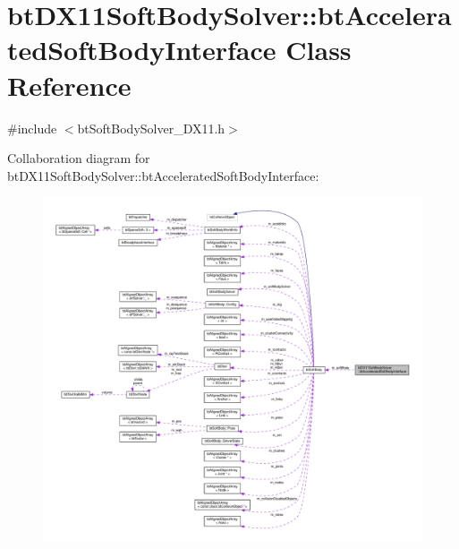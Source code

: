 \hypertarget{classbtDX11SoftBodySolver_1_1btAcceleratedSoftBodyInterface}{}\section{bt\+D\+X11\+Soft\+Body\+Solver\+:\+:bt\+Accelerated\+Soft\+Body\+Interface Class Reference}
\label{classbtDX11SoftBodySolver_1_1btAcceleratedSoftBodyInterface}


{\ttfamily \#include $<$bt\+Soft\+Body\+Solver\+\_\+\+D\+X11.\+h$>$}



Collaboration diagram for bt\+D\+X11\+Soft\+Body\+Solver\+:\+:bt\+Accelerated\+Soft\+Body\+Interface\+:
\nopagebreak
\begin{figure}[H]
\begin{center}
\leavevmode
\includegraphics[width=350pt]{classbtDX11SoftBodySolver_1_1btAcceleratedSoftBodyInterface__coll__graph}
\end{center}
\end{figure}
